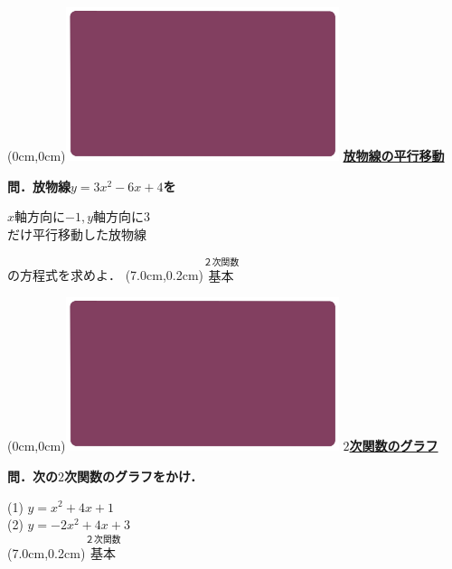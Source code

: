 \documentclass[10pt,
fleqn,
dvipdfmx,
uplatex
]{jsarticle}
\begin{document}
\newpage



\at(0cm,0cm){\includegraphics[width=8cm,bb=0 0 1920 1080]{./youtube/thumbnails/templates/smart_background/２次関数.jpeg}}
{\color{orange}\bf\boldmath\huge\underline{放物線の平行移動}}\vspace{0.3zw}

\large 
\bf\boldmath 問．放物線$y=3x^2-6x+4$を

\LARGE
\hspace{-0.1zw}
$x$軸方向に$-1,y$軸方向に$3$\\
\hfill だけ平行移動した放物線
\hspace{0.1zw}

\large
\vspace{0.5zw}
\hfill の方程式を求めよ．
\at(7.0cm,0.2cm){\small\color{bradorange}$\overset{\text{２次関数}}{\text{基本}}$}


\newpage



\at(0cm,0cm){\includegraphics[width=8cm,bb=0 0 1920 1080]{./youtube/thumbnails/templates/smart_background/２次関数.jpeg}}
{\color{orange}\bf\boldmath\huge\underline{$2$次関数のグラフ}}\vspace{0.3zw}

\Large 
\bf\boldmath 問．次の$2$次関数のグラフをかけ．

\huge
(1)  $y=x^2+4x+1$\\
(2)  $y=-2x^2+4x+3$\\

\at(7.0cm,0.2cm){\small\color{bradorange}$\overset{\text{２次関数}}{\text{基本}}$}
\end{document}
